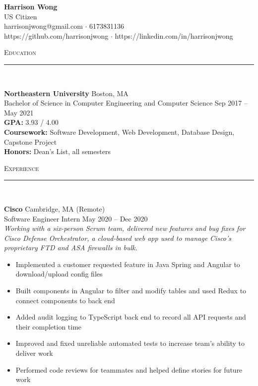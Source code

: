 \documentclass[11pt]{article}
\begin{document}
\small
\center
	\textbf{\huge Harrison Wong}  \\
	\vspace{0.05in}
	US Citizen \\
	harrisonjwong@gmail.com $\cdot$ 6173831136 \\
	https://github.com/harrisonjwong $\cdot$ https://linkedin.com/in/harrisonjwong \\
	\vspace{0.1in}
	
\begin{raggedright}


	\textsc{\Large Education} \\
	\vspace{-0.1in}
	\rule{\textwidth}{0.4pt} \\
	\vspace{0.05in}

	\textbf{\large Northeastern University} \hfill Boston, MA \\
	Bachelor of Science in Computer Engineering and Computer Science \hfill Sep 2017 -- May 2021 \\
	\textbf{GPA:} \hspace{33pt} 3.93 / 4.00 \\
	\textbf{Coursework:} Software Development, Web Development, Database Design, Capstone Project \\
	\textbf{Honors:} \hspace {19pt} Dean's List, all semesters
	\vspace{0.15in}
	
	
	\textsc{\Large Experience} \\
	\vspace{-0.1in}
	\rule{\textwidth}{0.4pt} \\
	\vspace{0.05in}
	
	\textbf{\large Cisco} \hfill Cambridge, MA (Remote)  \\
	Software Engineer Intern \hfill May 2020 -- Dec 2020 \\

	\textit{Working with a six-person Scrum team, delivered new features and bug fixes for Cisco Defense Orchestrator, a cloud-based web app used to manage Cisco's proprietary FTD and ASA firewalls in bulk.}
	\begin{itemize}
		\item Implemented a customer requested feature in Java Spring and Angular to download/upload config files
		\item Built components in Angular to filter and modify tables and used Redux to connect components to back end
		\item Added audit logging to TypeScript back end to record all API requests and their completion time
		\item Improved and fixed unreliable automated tests to increase team's ability to deliver work
		\item Performed code reviews for teammates and helped define stories for future work
	\end{itemize}
	\vspace{0.1in}
	

\end{raggedright}
\end{document}
